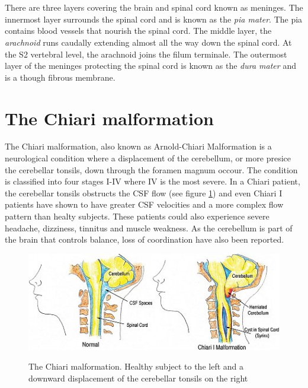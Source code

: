 \\
\\
There are three layers covering the brain and spinal cord known as meninges. The innermost layer surrounds the spinal cord and is known as the \textit{pia mater}. The pia contains blood vessels that nourish the spinal cord. The middle layer, the \textit{arachnoid} runs caudally extending almost all the way down the spinal cord. At the S2 vertebral level, the arachnoid joins the filum terminale. The outermost layer of the meninges protecting the spinal cord is known as the \textit{dura mater} and is a though fibrous membrane. 
\\
\section{The Chiari malformation}
The Chiari malformation, also known as Arnold-Chiari Malformation is a neurological condition where a displacement of the cerebellum, or more presice the cerebellar tonsils, down through the foramen magnum occour. The condition is classified into four stages I-IV where IV is the most severe. In a Chiari patient, the cerebellar tonsils obstructs the CSF flow (see figure \ref{fig:CSF}) and even Chiari I patients have shown to have greater CSF velocities and a more complex flow pattern than healty subjects. \cite{Quig04} These patients could also experience severe headache, dizziness, tinnitus and muscle weakness. As the cerebellum is part of the brain that controls balance, loss of coordination have also been reported. 
\begin{figure}[!ht]
\includegraphics[scale=0.8]{figures/Ida_CSF.png} \\
\caption{The Chiari malformation. Healthy subject to the left and a downward displacement of the cerebellar tonsils on the right} \label{fig:CSF}
\end{figure}
